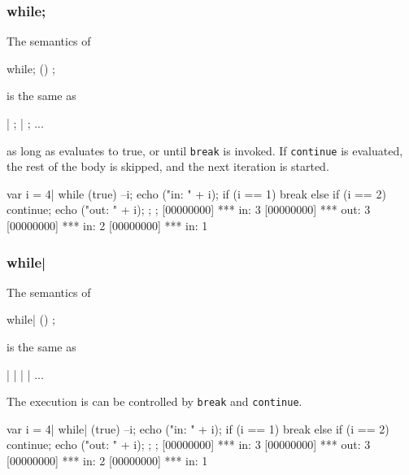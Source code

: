 \subsubsection{while;}

The semantics of

\begin{urbiunchecked}
while; ()
  ;
\end{urbiunchecked}

\noindent
is the same as

\begin{urbiunchecked}
 |  ;  |  ; ...
\end{urbiunchecked}

\noindent
as long as  evaluates to true, or until \lstinline|break| is
invoked.  If \lstinline|continue| is evaluated, the rest of the body
is skipped, and the next iteration is started.

\begin{urbiscript}
{
  var i = 4|
  while (true)
  {
    --i;
    echo ("in: " + i);
    if (i == 1)
      break
    else if (i == 2)
      continue;
    echo ("out: " + i);
  };
};
[00000000] *** in: 3
[00000000] *** out: 3
[00000000] *** in: 2
[00000000] *** in: 1
\end{urbiscript}


\subsubsection{while|}

The semantics of

\begin{urbiunchecked}
while| ()
  ;
\end{urbiunchecked}

\noindent
is the same as

\begin{urbiunchecked}
 |  |  |  | ...
\end{urbiunchecked}

The execution is can be controlled by \lstinline|break| and
\lstinline|continue|.

\begin{urbiscript}
{
  var i = 4|
  while| (true)
  {
    --i;
    echo ("in: " + i);
    if (i == 1)
      break
    else if (i == 2)
      continue;
    echo ("out: " + i);
  };
};
[00000000] *** in: 3
[00000000] *** out: 3
[00000000] *** in: 2
[00000000] *** in: 1
\end{urbiscript}


